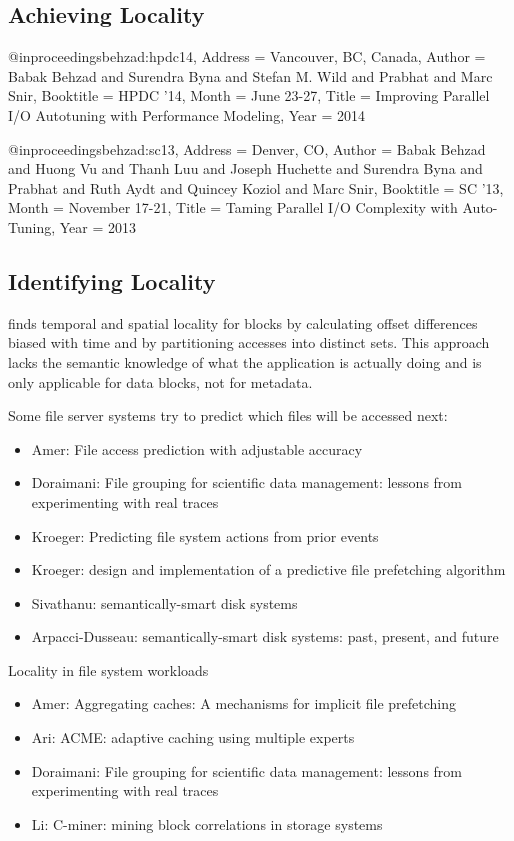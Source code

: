 \documentclass[conference]{acm_proc_article-sp} \usepackage[english]{babel}
\begin{document}
\subsection{Achieving Locality}

@inproceedings{behzad:hpdc14, Address = {Vancouver, BC, Canada}, Author =
{Babak Behzad and Surendra Byna and Stefan M. Wild and Prabhat and Marc Snir},
Booktitle = {HPDC '14}, Month = {June 23-27}, Title = {Improving Parallel I/O
Autotuning with Performance Modeling}, Year = {2014}}

@inproceedings{behzad:sc13, Address = {Denver, CO}, Author = {Babak Behzad and
Huong Vu and Thanh Luu and Joseph Huchette and Surendra Byna and Prabhat and
Ruth Aydt and Quincey Koziol and Marc Snir}, Booktitle = {SC '13}, Month =
{November 17-21}, Title = {Taming Parallel I/O Complexity with Auto-Tuning},
Year = {2013}}


\subsection{Identifying Locality} \cite{wildani:systor2011-block-locality}
finds temporal and spatial locality for blocks by calculating offset
differences biased with time and by partitioning accesses into distinct sets.
This approach lacks the semantic knowledge of what the application is actually
doing and is only applicable for data blocks, not for metadata.

Some file server systems try to predict which files will be accessed next:

\begin{itemize} \item Amer: File access prediction with adjustable accuracy
\item Doraimani: File grouping for scientific data management: lessons from
experimenting with real traces \item Kroeger: Predicting file system actions
from prior events \item Kroeger: design and implementation of a predictive file
prefetching algorithm \item Sivathanu: semantically-smart disk systems \item
Arpacci-Dusseau: semantically-smart disk systems: past, present, and future
\end{itemize}

Locality in file system workloads \begin{itemize} \item Amer: Aggregating
caches: A mechanisms for implicit file prefetching \item Ari: ACME: adaptive
caching using multiple experts \item Doraimani: File grouping for scientific
data management: lessons from experimenting with real traces \item Li: C-miner:
mining block correlations in storage systems \end{itemize}
\end{document}
